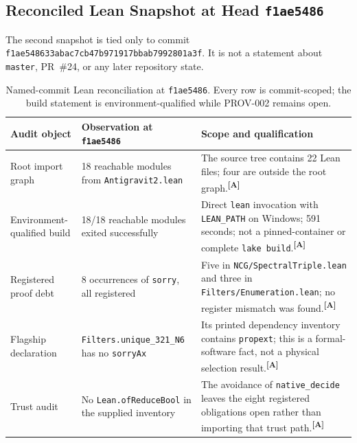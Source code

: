 \documentclass[12pt,a4paper,twoside]{article}
\theoremstyle{plain}
\theoremstyle{definition}
\theoremstyle{remark}
\newcommand{\catmark}[1]{\textsuperscript{\textsf{\textbf{[#1]}}}}
\begin{document}
\subsection{Reconciled Lean Snapshot at Head \texttt{f1ae5486}}
\label{subsec:formalization-status-f1ae5486}

The second snapshot is tied only to commit
\texttt{f1ae548633abac7cb47b971917bbab7992801a3f}. It is not a statement
about \texttt{master}, PR~\#24, or any later repository state.

\begin{table}[H]
\centering\small
\begin{tabular}{@{}lp{4.2cm}p{6.4cm}@{}}
\toprule
Audit object & Observation at \texttt{f1ae5486} & Scope and qualification \\
\midrule
Root import graph & 18 reachable modules from \texttt{Antigravit2.lean} &
The source tree contains 22 Lean files; four are outside the root graph.\catmark{A} \\
Environment-qualified build & 18/18 reachable modules exited successfully &
Direct \texttt{lean} invocation with \texttt{LEAN\_PATH} on Windows; 591 seconds; not a pinned-container or complete \texttt{lake build}.\catmark{A} \\
Registered proof debt & 8 occurrences of \texttt{sorry}, all registered &
Five in \texttt{NCG/SpectralTriple.lean} and three in \texttt{Filters/Enumeration.lean}; no register mismatch was found.\catmark{A} \\
Flagship declaration & \texttt{Filters.unique\_321\_N6} has no \texttt{sorryAx} &
Its printed dependency inventory contains \texttt{propext}; this is a formal-software fact, not a physical selection result.\catmark{A} \\
Trust audit & No \texttt{Lean.ofReduceBool} in the supplied inventory &
The avoidance of \texttt{native\_decide} leaves the eight registered obligations open rather than importing that trust path.\catmark{A} \\
\bottomrule
\end{tabular}
\caption{Named-commit Lean reconciliation at \texttt{f1ae5486}. Every row is commit-scoped; the build statement is environment-qualified while PROV-002 remains open.}
\label{tab:lean-status-f1ae5486}
\end{table}
\end{document}
